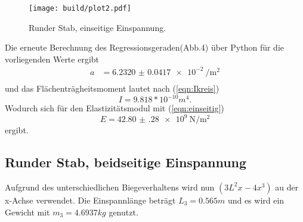 \begin{figure}[h]
  \centering
  \texttt{[image: build/plot2.pdf]}
  \caption{Runder Stab, einseitige Einspannung.}
  \label{fig:plot2}
\end{figure}

Die erneute Berechnung des Regressionsgeraden(Abb.4) über Python
für die vorliegenden Werte ergibt
\begin{align*}
  a &= \SI{6.2320(417)e-2}{\per\square\meter} \\
\end{align*}
und das Flächenträgheitsmoment lautet nach (\ref{eqn:Ikreis})
\begin{equation*}
  I = 9.818* 10^{-10} m^4.
\end{equation*}
\newline
Wodurch sich für den Elastizitätsmodul mit (\ref{eqn:einseitig})
\begin{equation*}
  E = \SI{42.80(28)e9}{\newton\per\square\meter}
\end{equation*}
ergibt.
\newpage
\subsection{Runder Stab, beidseitige Einspannung}
Aufgrund des unterschiedlichen Biegeverhaltens wird nun $(3L^2x-4x^3)$
au der x-Achse verwendet. Die Einspannlänge beträgt $L_3 = 0.565m$
und es wird ein Gewicht mit $m_3 = 4.6937 kg$ genutzt.


